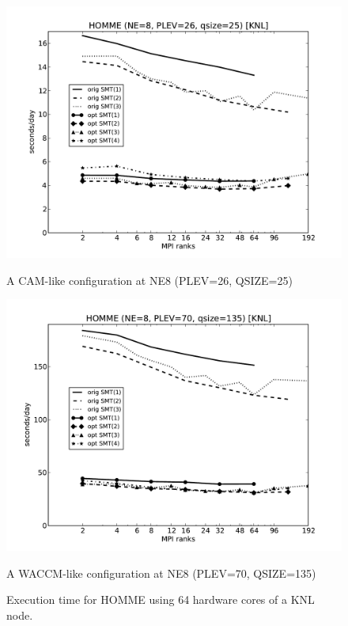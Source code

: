 \begin{figure}
\centering
\begin{minipage}{1.\textwidth}
  \centering
  \includegraphics[width=1.\linewidth,height=.44\textheight]{figures/homme-knl-ne8-cam.pdf}
 \caption{A CAM-like configuration at NE8 (PLEV=26, QSIZE=25)}
  \label{fig:homme-knl-ne8-cam}
\end{minipage}
\begin{minipage}{1.\textwidth}
   \centering
   \includegraphics[width=1.\linewidth,height=.44\textheight]{figures/homme-knl-ne8-waccm.pdf}
   \caption{A WACCM-like configuration at NE8 (PLEV=70, QSIZE=135)}
   \label{fig:homme-knl-ne8-waccm}
\end{minipage}
\caption{Execution time for HOMME using 64 hardware cores of a KNL node.}
\end{figure}
